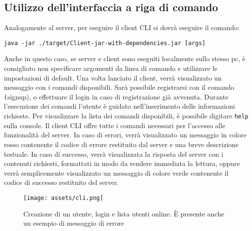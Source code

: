 \documentclass{article}
\begin{document}
\subsection{Utilizzo dell'interfaccia a riga di comando}

Analogamente al server, per eseguire il client CLI si dovrà eseguire il comando:
\begin{center}
    \texttt{java -jar ./target/Client-jar-with-dependencies.jar [args]}
\end{center}
Anche in questo caso, se server e client sono eseguiti localmente sullo stesso pc, è consigliato non specificare argomenti da linea di comando e utilizzare le impostazioni di default.
Una volta lanciato il client, verrà visualizzato un messaggio con i comandi disponibili. Sarà possibile registrarsi con il comando \texttt(signup), o effettuare il login in caso di registrazione già avvenuta. 
Durante l'esecuzione dei comandi l'utente è guidato nell'inserimento delle informazioni richieste. Per visualizzare la lista dei comandi disponibili, è possibile digitare \texttt{help} sulla console.
Il client CLI offre tutte i comandi necessari per l'accesso alle funzionalità del server. In caso di errori, verrà visualizzato un messaggio in colore rosso contenente il codice di errore restituito dal server e una breve descrizione testuale. In caso di successo, verrà visualizzata la risposta del server con i contenuti richiesti, formattati in modo da rendere immediata la lettura, oppure verrà semplicemente visualizzato un messaggio di colore verde contenente il codice di successo restituito del server.
\begin{figure}[htbp]
    \texttt{[image: assets/cli.png]}
    \centering
    \caption{\centering \label{fig:example1}Creazione di un utente, login e lista utenti online. È presente anche un esempio di messaggio di errore}
\end{figure}
\end{document}

